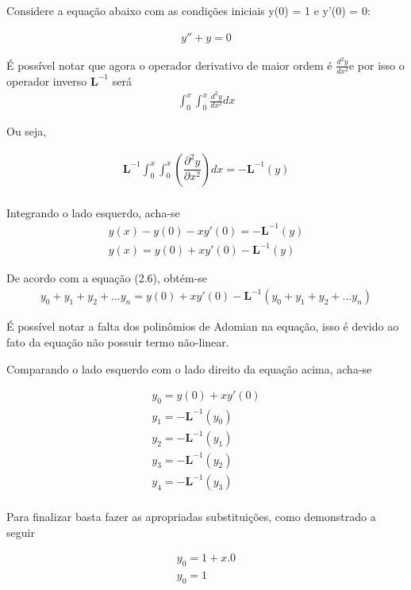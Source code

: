 Considere a equação abaixo com as condições iniciais y(0) = 1 e y'(0) = 0:

\begin{gather*}
  y'' + y = 0
\end{gather*}

É possível notar que agora o operador derivativo de maior ordem é $\frac{d^2y }{d x^2}$e por isso o operador inverso $\textbf{L}^{-1}$ será
\begin{gather*}
 \int_0^x \int_0^x  \frac{d^2y }{d x^2}dx
\end{gather*}

Ou seja,

\begin{gather*}
 \textbf{L}^{-1}\int_0^x \int_0^x  \left(\dfrac{\partial^2y }{\partial x^2}\right)dx = -\textbf{L}^{-1}(y)\\
\end{gather*}

Integrando o lado esquerdo, acha-se
\begin{gather*}
y(x) - y(0) - xy'(0) = - \textbf{L}^{-1}(y)\\
y(x) = y(0) + xy'(0) - \textbf{L}^{-1}(y)
\end{gather*}

De acordo com a equação (2.6), obtém-se 
\begin{gather*}
y_{0} + y_{1} + y_{2} + ...y_{n} = y(0) + xy'(0) - \textbf{L}^{-1}(y_{0} + y_{1} + y_{2}+...y_{n})
\end{gather*}

É possível notar a falta dos polinômios de Adomian na equação, isso é devido ao fato da equação não possuir termo não-linear. 

Comparando o lado esquerdo com o lado direito da equação acima, acha-se

\begin{gather*}
y_{0} = y(0) + xy'(0) \\
y_{1} = -\textbf{L}^{-1}(y_{0})\\
y_{2} = -\textbf{L}^{-1}(y_{1})\\
y_{3} = -\textbf{L}^{-1}(y_{2})\\
y_{4} = -\textbf{L}^{-1}(y_{3})\\
\end{gather*}

Para finalizar basta fazer as apropriadas substituições, como demonstrado a seguir

\begin{gather*}
y_{0} = 1 + x.0\\
y_{0} = 1\\
\end{gather*}

